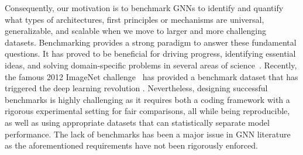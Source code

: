 \documentclass{article}
\begin{document}
Consequently, our motivation is to benchmark GNNs to identify and quantify what types of architectures, first principles or mechanisms are universal, generalizable, and scalable when we move to larger and more challenging datasets. Benchmarking provides a strong paradigm to answer these fundamental questions. It has proved to be beneficial for driving progress, identifying essential ideas, and solving domain-specific problems in several areas of science~\cite{weber2019essential}. 
Recently, the famous 2012 ImageNet challenge~\cite{imagenet_cvpr09} has provided a benchmark dataset that has triggered the deep learning revolution \cite{DBLP:conf/nips/KrizhevskySH12,10.1145/3065384}. Nevertheless, designing successful benchmarks is highly challenging as it requires both a coding framework with a rigorous experimental setting for fair comparisons, all while being reproducible, as well as using appropriate datasets that can statistically separate model performance. 
The lack of benchmarks has been a major issue in GNN literature as the aforementioned requirements have not been rigorously enforced.
\end{document}
